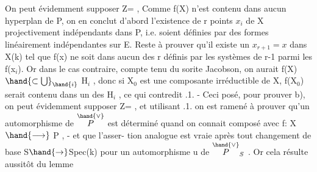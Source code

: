 On peut évidemment supposer Z=\hand{$\emptyset$} ,   Comme  f(X) n'est contenu dans
aucun hyperplan de P, on en conclut d'abord l'existence de r points
$x_i$ de X  projectivement indépendants dans P, i.e. soient définies
par des formes linéairement indépendantes sur E.   Reste à prouver qu'il
existe un  $x_{r+1} = x$   dans X(k) tel que  f(x) ne soit dans aucun des r
  définis par les  systèmes de r-1 parmi les f(x$_i$). Or dans
le cas contraire, compte tenu du sorite Jacobson,  on aurait
f(X) $\hand{\subset\bigcup}_{\hand{i}}$ H$_i$ , donc  si X$_0$  est une composante
irréductible de X, f(X$_0$) serait contenu dans un des H$_i$ , ce qui contredit
.1. - Ceci posé,  pour prouver b), on peut  évidemment supposer Z=\hand{$\emptyset$} ,
et utilisant .1.  on est ramené à prouver qu'un automorphisme de $\overset{\hand{\vee}}{P}$ est
déterminé quand on connait  composé avec f: X$\hand{\longrightarrow}$ P , - et que l'asser-%
tion analogue est vraie après tout changement de base S$\hand{\rightarrow}$Spec(k)
pour un  automorphisme u de $\overset{\hand{\vee}}{P}_S$  .  Or cela résulte aussitôt  du lemme

